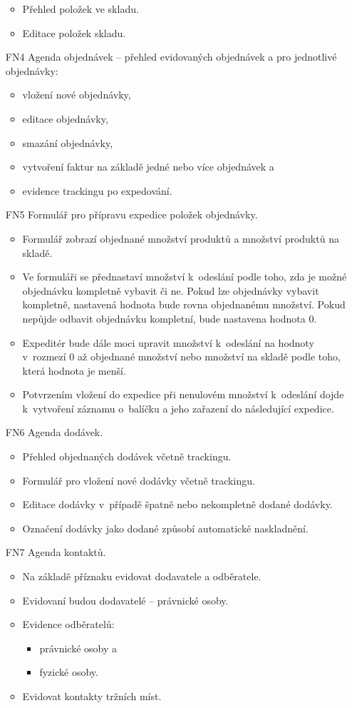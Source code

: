 \documentclass[thesis=B,czech]{FITthesis}[2012/06/26]
\begin{document}
\begin{enumerate}
\begin{itemize}
			\item Přehled položek ve skladu.
			\item Editace položek skladu.
		\end{itemize}
	\item[FN4] Agenda objednávek -- přehled evidovaných objednávek a pro jednotlivé objednávky:
	\begin{itemize}
		\item vložení nové objednávky,
		\item editace objednávky,
		\item smazání objednávky,
		\item vytvoření faktur na základě jedné nebo více objednávek a
		\item evidence trackingu po expedování.
	\end{itemize}
	\item[FN5] Formulář pro přípravu expedice položek objednávky.
	\begin{itemize}
		\item Formulář zobrazí objednané množství produktů a množství produktů na skladě. 
		\item Ve formuláři se přednastaví množství k~odeslání podle toho, zda je možné objednávku kompletně vybavit či ne. Pokud lze objednávky vybavit kompletně, nastavená hodnota bude rovna objednanému množství. Pokud nepůjde odbavit objednávku kompletní, bude nastavena hodnota 0.
		\item Expeditér bude dále moci upravit množství k~odeslání na hodnoty v~rozmezí 0 až objednané množství nebo množství na skladě podle toho, která hodnota je menší.
		\item Potvrzením vložení do expedice při nenulovém množství k~odeslání dojde k~vytvoření záznamu o~balíčku a jeho zařazení do následující expedice.
	\end{itemize}
	\item[FN6] Agenda dodávek.
	\begin{itemize}
		\item Přehled objednaných dodávek včetně trackingu.
		\item Formulář pro vložení nové dodávky včetně trackingu.
		\item Editace dodávky v~případě špatně nebo nekompletně dodané dodávky.
		\item Označení dodávky jako dodané způsobí automatické naskladnění.
	\end{itemize}
	\item[FN7] Agenda kontaktů.
	\begin{itemize}
		\item Na základě příznaku evidovat dodavatele a odběratele.
		\item Evidovaní budou dodavatelé -- právnické osoby.
		\item Evidence odběratelů:
		\begin{itemize}
			\item právnické osoby a
			\item fyzické osoby.
		\end{itemize}
		\item Evidovat kontakty tržních míst.
	\end{itemize}


\end{enumerate}
\end{document}
